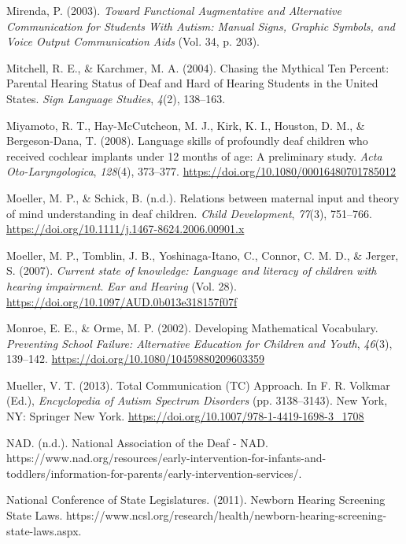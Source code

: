 \documentclass[english,man]{apa6}
\begin{document}
\leavevmode\hypertarget{ref-mirenda2003}{}%
Mirenda, P. (2003). \emph{Toward Functional Augmentative and Alternative Communication for Students With Autism: Manual Signs, Graphic Symbols, and Voice Output Communication Aids} (Vol. 34, p. 203).

\leavevmode\hypertarget{ref-mitchell2004}{}%
Mitchell, R. E., \& Karchmer, M. A. (2004). Chasing the Mythical Ten Percent: Parental Hearing Status of Deaf and Hard of Hearing Students in the United States. \emph{Sign Language Studies}, \emph{4}(2), 138--163.

\leavevmode\hypertarget{ref-miyamoto2008}{}%
Miyamoto, R. T., Hay-McCutcheon, M. J., Kirk, K. I., Houston, D. M., \& Bergeson-Dana, T. (2008). Language skills of profoundly deaf children who received cochlear implants under 12 months of age: A preliminary study. \emph{Acta Oto-Laryngologica}, \emph{128}(4), 373--377. \url{https://doi.org/10.1080/00016480701785012}

\leavevmode\hypertarget{ref-moeller2006}{}%
Moeller, M. P., \& Schick, B. (n.d.). Relations between maternal input and theory of mind understanding in deaf children. \emph{Child Development}, \emph{77}(3), 751--766. \url{https://doi.org/10.1111/j.1467-8624.2006.00901.x}

\leavevmode\hypertarget{ref-moeller2007}{}%
Moeller, M. P., Tomblin, J. B., Yoshinaga-Itano, C., Connor, C. M. D., \& Jerger, S. (2007). \emph{Current state of knowledge: Language and literacy of children with hearing impairment}. \emph{Ear and Hearing} (Vol. 28). \url{https://doi.org/10.1097/AUD.0b013e318157f07f}

\leavevmode\hypertarget{ref-monroe2002}{}%
Monroe, E. E., \& Orme, M. P. (2002). Developing Mathematical Vocabulary. \emph{Preventing School Failure: Alternative Education for Children and Youth}, \emph{46}(3), 139--142. \url{https://doi.org/10.1080/10459880209603359}

\leavevmode\hypertarget{ref-mueller2013}{}%
Mueller, V. T. (2013). Total Communication (TC) Approach. In F. R. Volkmar (Ed.), \emph{Encyclopedia of Autism Spectrum Disorders} (pp. 3138--3143). New York, NY: Springer New York. \url{https://doi.org/10.1007/978-1-4419-1698-3_1708}

\leavevmode\hypertarget{ref-nad}{}%
NAD. (n.d.). National Association of the Deaf - NAD. https://www.nad.org/resources/early-intervention-for-infants-and-toddlers/information-for-parents/early-intervention-services/.

\leavevmode\hypertarget{ref-nationalconferenceofstatelegislatures2011}{}%
National Conference of State Legislatures. (2011). Newborn Hearing Screening State Laws. https://www.ncsl.org/research/health/newborn-hearing-screening-state-laws.aspx.
\end{document}
